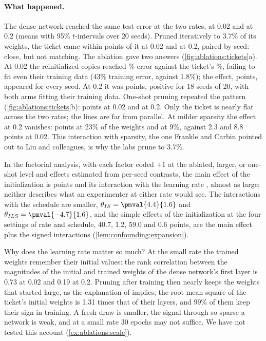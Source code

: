 \begin{refsection}
\paragraph{What happened.} The dense network reached the same test error at the two rates,  at 0.02 and  at 0.2 (means with 95\% $t$-intervals over 20 seeds). Pruned iteratively to 3.7\% of its weights, the ticket came within  points of it at 0.02 and  at 0.2, paired by seed: close, but not matching. The ablation gave two answers (\cref{fig:ablations:tickets}a). At 0.02 the reinitialized copies reached \% error against the ticket's \%, failing to fit even their training data (43\% training error, against 1.8\%); the effect,  points, appeared for every seed. At 0.2 it was  points, positive for 18 seeds of 20, with both arms fitting their training data. One-shot pruning repeated the pattern (\cref{fig:ablations:tickets}b):  points at 0.02 and  at 0.2. Only the ticket is nearly flat across the two rates; the lines are far from parallel. At milder sparsity the effect at 0.2 vanishes:  points at 23\% of the weights and  at 9\%, against 2.3 and 8.8 points at 0.02. This interaction with sparsity, the one Frankle and Carbin pointed out to Liu and colleagues, is why the labs prune to 3.7\%.

In the factorial analysis, with each factor coded $+1$ at the ablated, larger, or one-shot level and effects estimated from per-seed contrasts, the main effect of the initialization is  points and its interaction with the learning rate , almost as large; neither describes what an experimenter at either rate would see. The interactions with the schedule are smaller, $\theta_{IS}=\pmval{4.4}{1.6}$ and $\theta_{ILS}=\pmval{-4.7}{1.6}$, and the simple effects of the initialization at the four settings of rate and schedule, 40.7, 1.2, 59.0 and 0.6 points, are the main effect plus the signed interactions (\cref{lem:confounding:expansion}).

Why does the learning rate matter so much? At the small rate the trained weights remember their initial values: the rank correlation between the magnitudes of the initial and trained weights of the dense network's first layer is 0.73 at 0.02 and 0.19 at 0.2. Pruning after training then nearly keeps the weights that started large, as the explanation of \textcite{LiuEtAl2019} implies; the root mean square of the ticket's initial weights is 1.31 times that of their layers, and 99\% of them keep their sign in training. A fresh draw is smaller, the signal through so sparse a network is weak, and at a small rate 30 epochs may not suffice. We have not tested this account (\cref{ex:ablations:scale}).


\end{refsection}
